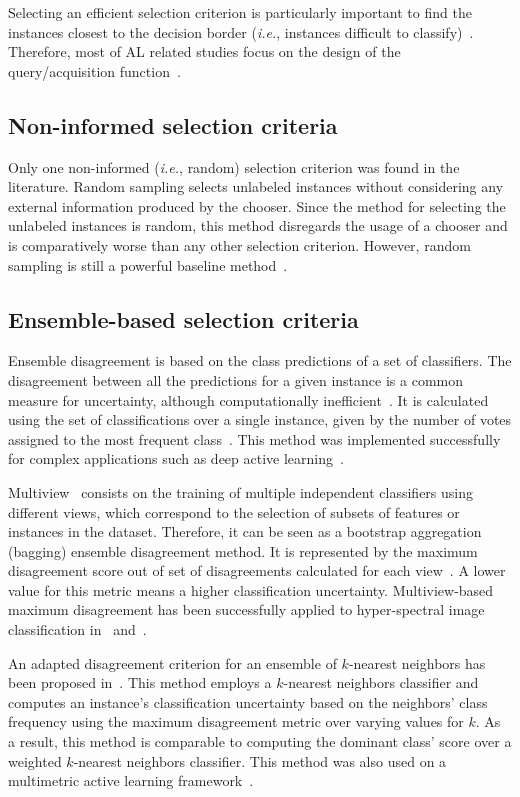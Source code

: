 \documentclass[remotesensing,article,submit,moreauthors,pdftex]{Definitions/mdpi}
\begin{document}
Selecting an efficient selection criterion is particularly important to find
the instances closest to the decision border (\textit{i.e.}, instances
difficult to classify)~\cite{Shrivastava2021}. Therefore, most of AL related
studies focus on the design of the query/acquisition function~\cite{Su2020}.

\subsection{Non-informed selection criteria}

Only one non-informed (\textit{i.e.}, random) selection criterion was found in
the literature. Random sampling selects unlabeled instances without
considering any external information produced by the chooser. Since the method
for selecting the unlabeled instances is random, this method disregards the
usage of a chooser and is comparatively worse than any other selection
criterion. However, random sampling is still a powerful baseline
method~\cite{Cawley2011}. 

\subsection{Ensemble-based selection criteria}

Ensemble disagreement is based on the class predictions of a set of
classifiers. The disagreement between all the predictions for a given
instance is a common measure for uncertainty, although computationally
inefficient~\cite{Ruzicka2020,Pasolli2016}. It is calculated using the set of
classifications over a single instance, given by the number of votes
assigned to the most frequent class~\cite{Shrivastava2021}. This method was
implemented successfully for complex applications such as deep active
learning~\cite{Ruzicka2020}.

Multiview~\cite{Muslea2006} consists on the training of multiple independent
classifiers using different views, which correspond to the selection of subsets
of features or instances in the dataset. Therefore, it can be seen as a
bootstrap aggregation (bagging) ensemble disagreement method. It is represented
by the maximum disagreement score out of set of disagreements calculated for
each view~\cite{Shrivastava2021}. A lower value for this metric means a higher
classification uncertainty. Multiview-based maximum disagreement has been
successfully applied to hyper-spectral image classification in~\cite{Di2012}
and~\cite{Zhou2014}.

An adapted disagreement criterion for an ensemble of $k$-nearest neighbors has
been proposed in~\cite{Pasolli2016}. This method employs a $k$-nearest
neighbors classifier and computes an instance's classification uncertainty
based on the neighbors' class frequency using the maximum disagreement metric
over varying values for $k$. As a result, this method is comparable to
computing the dominant class' score over a weighted $k$-nearest neighbors
classifier. This method was also used on a multimetric active learning
framework~\cite{Zhang2016}.
\end{document}
